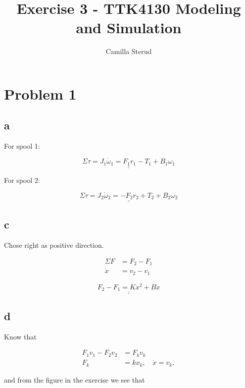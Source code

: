 \documentclass{article}
\title{Exercise 3 - TTK4130 Modeling and Simulation}
\author{Camilla Sterud}
\date{}
\begin{document}
\maketitle

\newpage

\section{Problem 1}

\subsection{a}

For spool 1:

\begin{equation*}
\underline{\underline{\Sigma\tau = J_1\dot\omega_1 = F_1r_1 - T_1 + B_1\omega_1}}
\end{equation*}

For spool 2:

\begin{equation*}
\underline{\underline{\Sigma\tau = J_2\dot\omega_2 = -F_2r_2 + T_2 + B_2\omega_2}}
\end{equation*}


\subsection{c}

Chose right as positive direction. 

\begin{align*}
	\Sigma F &= F_2 - F_1\\
	\dot x &= v_2 - v_1
\end{align*}

\begin{equation*}
	\underline{\underline{F_2 - F_1 = Kx^2 + B\dot x}}
\end{equation*}

\subsection{d}

Know that 

\begin{align*}
	F_1v_1 - F_2v_2 &= F_kv_k \\
	F_k &= kx_k, \quad \dot x = v_k,
\end{align*}

and from the figure in the exercise we see that
\end{document}

